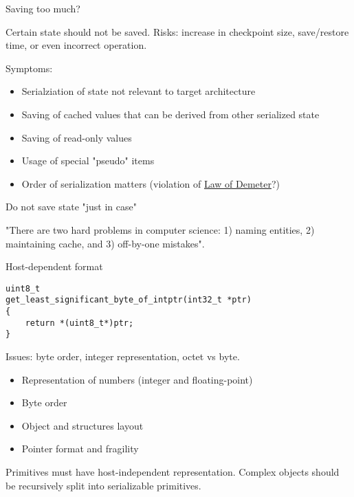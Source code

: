 \begin{frame}{Saving too much?}

Certain state should not be saved. Risks: increase in checkpoint size, save/restore time, or even incorrect operation.

Symptoms:

\begin{itemize}
    \item Serialziation of state not relevant to target architecture
    \item Saving of cached values that can be derived from other serialized state
    \item Saving of read-only values
    \item Usage of special "pseudo" items
    \item Order of serialization matters (violation of \href{https://en.wikipedia.org/wiki/Law_of_Demeter}{Law of Demeter}?)
\end{itemize}

Do not save state "just in case"

\pause "There are two hard problems in computer science: 1) naming entities, 2) maintaining cache, and 3) off-by-one mistakes".

\end{frame}

\begin{frame}[fragile]{Host-dependent format}

\begin{lstlisting}
uint8_t 
get_least_significant_byte_of_intptr(int32_t *ptr) 
{
    return *(uint8_t*)ptr;
}
\end{lstlisting}

\pause
Issues: byte order, integer representation, octet vs byte.

\pause
\begin{itemize}
    \item Representation of numbers (integer and floating-point)
    \item Byte order
    \item Object and structures layout
    \item Pointer format and fragility
\end{itemize}

Primitives must have host-independent representation. 
Complex objects should be recursively split into serializable primitives.

\end{frame}

